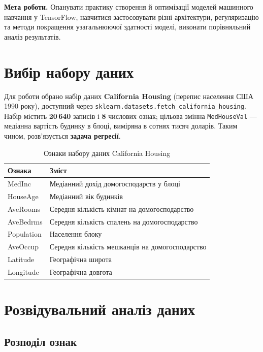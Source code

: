 \documentclass[14pt,a4paper]{extreport}
\begin{document}

\textbf{Мета роботи.} Опанувати практику створення й оптимізації моделей машинного навчання у TensorFlow, навчитися застосовувати різні архітектури, регуляризацію та методи покращення узагальнюючої здатності моделі, виконати порівняльний аналіз результатів.

\section{Вибір набору даних}

Для роботи обрано набір даних \textbf{California Housing} (перепис населення США 1990 року), доступний через \texttt{sklearn.datasets.fetch\_california\_housing}. Набір містить \textbf{20\,640} записів і \textbf{8} числових ознак; цільова змінна \texttt{MedHouseVal} --- медіанна вартість будинку в блоці, виміряна в сотнях тисяч доларів. Таким чином, розв'язується \textbf{задача регресії}.

\begin{table}[H]
\caption{Ознаки набору даних California Housing}
\label{tab:features}
\begin{tabularx}{\linewidth}{|l|X|}
\hline
\textbf{Ознака} & \textbf{Зміст} \\
\hline
MedInc & Медіанний дохід домогосподарств у блоці \\
\hline
HouseAge & Медіанний вік будинків \\
\hline
AveRooms & Середня кількість кімнат на домогосподарство \\
\hline
AveBedrms & Середня кількість спалень на домогосподарство \\
\hline
Population & Населення блоку \\
\hline
AveOccup & Середня кількість мешканців на домогосподарство \\
\hline
Latitude & Географічна широта \\
\hline
Longitude & Географічна довгота \\
\hline
\end{tabularx}
\end{table}

\section{Розвідувальний аналіз даних}

\subsection{Розподіл ознак}
\end{document}
